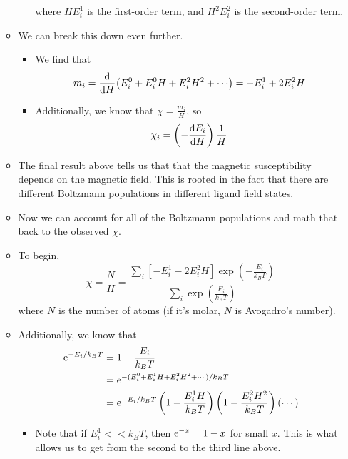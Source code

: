 \documentclass[../notes.tex]{subfiles}
\begin{document}
\begin{itemize}
\begin{itemize}
\begin{itemize}
            where $HE_i^1$ is the first-order term, and $H^2E_i^2$ is the second-order term.
        \end{itemize}
        \item We can break this down even further.
        \begin{itemize}
            \item We find that
            \begin{equation*}
                m_i = \dv{H}(E_i^0+E_i^0H+E_i^2H^2+\cdots)
                = -E_i^1+2E_i^2H
            \end{equation*}
            \item Additionally, we know that $\chi=\frac{m_i}{H}$, so
            \begin{equation*}
                \chi_i = \left( -\dv{E_i}{H} \right)\frac{1}{H}
            \end{equation*}
        \end{itemize}
        \item The final result above tells us that that the magnetic susceptibility depends on the magnetic field. This is rooted in the fact that there are different Boltzmann populations in different ligand field states.
        \item Now we can account for all of the Boltzmann populations and math that back to the observed $\chi$.
        \item To begin,
        \begin{equation*}
            \chi = \frac{N}{H}
            = \frac{\sum_i[-E_i^1-2E_i^2H]\exp\left( -\frac{E_i}{k_BT} \right)}{\sum_i\exp\left( \frac{E_i}{k_BT} \right)}
        \end{equation*}
        where $N$ is the number of atoms (if it's molar, $N$ is Avogadro's number).
        \item Additionally, we know that
        \begin{align*}
            \e[-E_i/k_BT] &= 1-\frac{E_i}{k_BT}\\
            &= \e[-(E_i^0+E_i^1H+E_i^2H^2+\cdots)/k_BT]\\
            &= \e[-E_i/k_BT]\left( 1-\frac{E_i^1H}{k_BT} \right)\left( 1-\frac{E_i^2H^2}{k_BT} \right)(\cdots)
        \end{align*}
        \begin{itemize}
            \item Note that if $E_i^1<<k_BT$, then $\e[-x]=1-x$ for small $x$. This is what allows us to get from the second to the third line above.
        \end{itemize}

\end{itemize}
\end{itemize}
\end{document}
